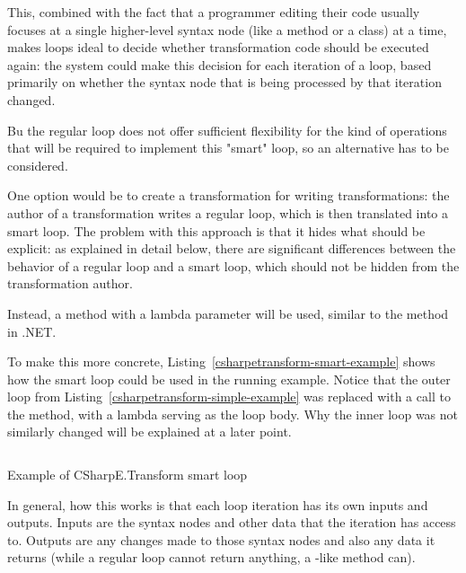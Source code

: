 This, combined with the fact that a programmer editing their code usually focuses at a single higher-level syntax node (like a method or a class) at a time, makes  loops ideal to decide whether transformation code should be executed again: the system could make this decision for each iteration of a  loop, based primarily on whether the syntax node that is being processed by that iteration changed.

Bu the regular  loop does not offer sufficient flexibility for the kind of operations that will be required to implement this "smart"  loop, so an alternative has to be considered.

One option would be to create a transformation for writing transformations: the author of a transformation writes a regular  loop, which is then translated into a smart loop. The problem with this approach is that it hides what should be explicit: as explained in detail below, there are significant differences between the behavior of a regular  loop and a smart loop, which should not be hidden from the transformation author.

Instead, a method with a lambda parameter will be used, similar to the  method in .NET. \cite{parallel-foreach}

\medskip

To make this more concrete, Listing~\ref{csharpetransform-smart-example} shows how the smart  loop could be used in the running example. Notice that the outer  loop from Listing~\ref{csharpetransform-simple-example} was replaced with a call to the  method, with a lambda serving as the loop body. Why the inner loop was not similarly changed will be explained at a later point.

\begin{listing}
\inputminted[firstline=9,lastline=27]{csharp}{samples/CSharpETransform.Smart/EntityTransformation.cs}
\caption{Example of CSharpE.Transform smart  loop}
\label{csharpetransform-smart-example}
\end{listing}

\medskip

In general, how this works is that each loop iteration has its own inputs and outputs. Inputs are the syntax nodes and other data that the iteration has access to. Outputs are any changes made to those syntax nodes and also any data it returns (while a regular  loop cannot return anything, a -like method can).

